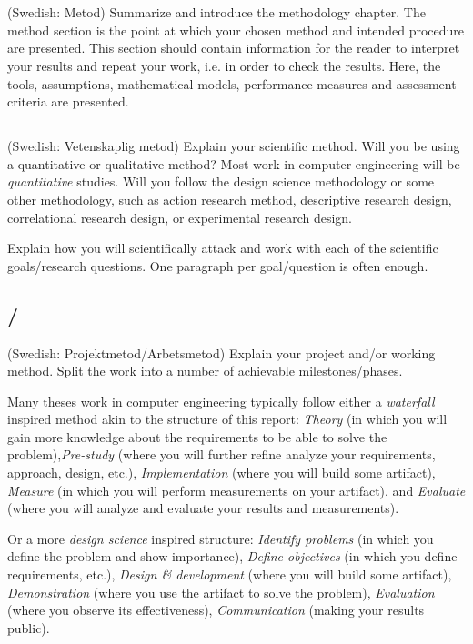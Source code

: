 \section{}\label{sec:method}
(Swedish: Metod) Summarize and introduce the methodology chapter. The method section is the point at which your chosen method and intended procedure are presented. This section should contain information for the reader to interpret your results and repeat your work, i.e. in order to check the results. Here, the tools, assumptions, mathematical models, performance measures and assessment criteria are presented.

\subsection{}
(Swedish: Vetenskaplig metod) Explain your scientific method. Will you be using a quantitative or qualitative method? Most work in computer engineering will be \emph{quantitative} studies. Will you follow the design science methodology or some other methodology, such as action research method, descriptive research design, correlational research design, or experimental research design. 

Explain how you will scientifically attack and work with each of the scientific goals/research questions. One paragraph per goal/question is often enough.

\subsection{/}
(Swedish: Projektmetod/Arbetsmetod) Explain your project and/or working method. Split the work into a number of achievable milestones/phases. 

Many theses work in computer engineering typically follow either a \emph{waterfall} inspired method akin to the structure of this report: \emph{Theory} (in which you will gain more knowledge about the requirements to be able to solve the problem),\emph{Pre-study} (where you will further refine analyze your requirements, approach, design, etc.), \emph{Implementation} (where you will build some artifact), \emph{Measure} (in which you will perform measurements on your artifact), and \emph{Evaluate} (where you will analyze and evaluate your results and measurements). 

Or a more \emph{design science} inspired structure: \emph{Identify problems} (in which you define the problem and show importance), \emph{Define objectives} (in which you define requirements, etc.), \emph{Design \& development} (where you will build some artifact), \emph{Demonstration} (where you use the artifact to solve the problem), \emph{Evaluation} (where you observe its effectiveness), \emph{Communication} (making your results public). 

